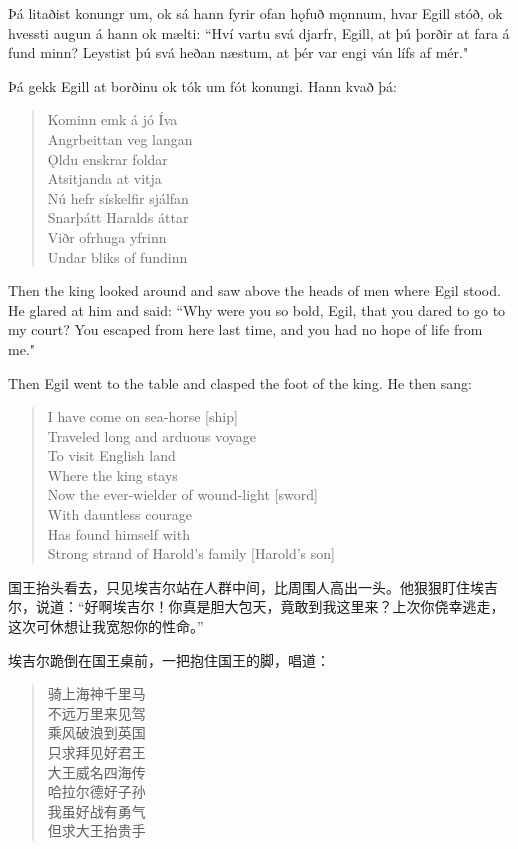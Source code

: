 \begin{paracol}{2}
    Þá litaðist konungr um, ok sá hann fyrir ofan hǫfuð mǫnnum, hvar Egill stóð, ok hvessti augun á hann ok mælti: ``Hví vartu svá djarfr, Egill, at þú þorðir at fara á fund minn? Leystist þú svá heðan næstum, at þér var engi ván lífs af mér."

    Þá gekk Egill at borðinu ok tók um fót konungi. Hann kvað þá:
    \begin{quote}
        Kominn emk á jó Íva\\
        Angrbeittan veg langan\\
        \MakeUppercase{ǫ}ldu enskrar foldar\\
        Atsitjanda at vitja\\
        Nú hefr sískelfir sjálfan\\
        Snarþátt Haralds áttar\\
        Viðr ofrhuga yfrinn\\
        Undar bliks of fundinn
    \end{quote}
    \switchcolumn
    Then the king looked around and saw above the heads of men where Egil stood. He glared at him and said: ``Why were you so bold, Egil, that you dared to go to my court? You escaped from here last time, and you had no hope of life from me."

    Then Egil went to the table and clasped the foot of the king. He then sang:
    \begin{quote}
        I have come on sea-horse [ship]\\
        Traveled long and arduous voyage\\
        To visit English land\\
        Where the king stays\\
        Now the ever-wielder of wound-light [sword]\\
        With dauntless courage\\
        Has found himself with\\
        Strong strand of Harold's family [Harold's son]
    \end{quote}
\end{paracol}
\begin{translation*}{}
    国王抬头看去，只见埃吉尔站在人群中间，比周围人高出一头。他狠狠盯住埃吉尔，说道：“好啊埃吉尔！你真是胆大包天，竟敢到我这里来？上次你侥幸逃走，这次可休想让我宽恕你的性命。”

    埃吉尔跪倒在国王桌前，一把抱住国王的脚，唱道：

    \begin{quote}
        骑上海神千里马\\
        不远万里来见驾\\
        乘风破浪到英国\\
        只求拜见好君王\\
        大王威名四海传\\
        哈拉尔德好子孙\\
        我虽好战有勇气\\
        但求大王抬贵手
    \end{quote}

\end{translation*}
